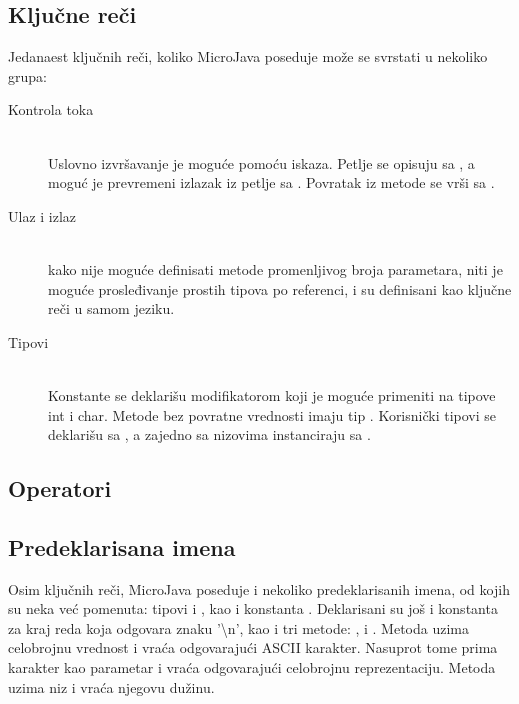 \subsection*{Ključne reči}

Jedanaest ključnih reči, koliko MicroJava poseduje može se svrstati u nekoliko grupa:

\begin{description}
    \item[Kontrola toka] \hfill \\
    Uslovno izvršavanje je moguće pomoću  iskaza. Petlje se opisuju sa , a moguć je prevremeni izlazak iz petlje sa . Povratak iz metode se vrši sa .

   \item[Ulaz i izlaz] \hfill \\
	kako nije moguće definisati metode promenljivog broja parametara, niti je moguće prosleđivanje prostih tipova po referenci,  i  su definisani kao ključne reči u samom jeziku.

	\item[Tipovi] \hfill \\
	Konstante se deklarišu modifikatorom  koji je moguće primeniti na tipove int i char. Metode bez povratne vrednosti imaju tip . Korisnički tipovi se deklarišu sa , a zajedno sa nizovima instanciraju sa .

\end{description}


\subsection*{Operatori}



\subsection*{Predeklarisana imena}

Osim ključnih reči, MicroJava poseduje i nekoliko predeklarisanih imena, od kojih su neka već pomenuta: tipovi  i , kao i konstanta . Deklarisani su još i konstanta za kraj reda  koja odgovara znaku '\textbackslash n', kao i tri metode: ,  i . Metoda   uzima celobrojnu vrednost i vraća odgovarajući ASCII karakter. Nasuprot tome  prima karakter kao parametar i vraća odgovarajući celobrojnu reprezentaciju. Metoda  uzima niz i vraća njegovu dužinu. 

